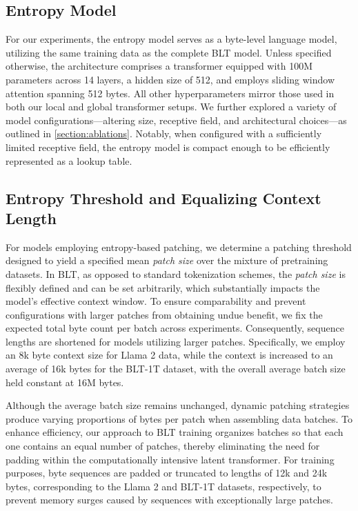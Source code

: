 \subsection{Entropy Model} For our experiments, the entropy model serves as a byte-level language model, utilizing the same training data as the complete {\textsc BLT} model. Unless specified otherwise, the architecture comprises a transformer equipped with 100M parameters across 14 layers, a hidden size of 512, and employs sliding window attention spanning 512 bytes. All other hyperparameters mirror those used in both our local and global transformer setups. We further explored a variety of model configurations—altering size, receptive field, and architectural choices—as outlined in \autoref{section:ablations}. Notably, when configured with a sufficiently limited receptive field, the entropy model is compact enough to be efficiently represented as a lookup table.

\subsection{Entropy Threshold and Equalizing Context Length} For models employing entropy-based patching, we determine a patching threshold designed to yield a specified mean \textit{patch size} over the mixture of pretraining datasets. In {\textsc BLT}, as opposed to standard tokenization schemes, the \textit{patch size} is flexibly defined and can be set arbitrarily, which substantially impacts the model's effective context window. To ensure comparability and prevent configurations with larger patches from obtaining undue benefit, we fix the expected total byte count per batch across experiments. Consequently, sequence lengths are shortened for models utilizing larger patches. Specifically, we employ an 8k byte context size for Llama 2 data, while the context is increased to an average of 16k bytes for the {\textsc BLT}-1T dataset, with the overall average batch size held constant at 16M bytes.

Although the average batch size remains unchanged, dynamic patching strategies produce varying proportions of bytes per patch when assembling data batches. To enhance efficiency, our approach to {\textsc BLT} training organizes batches so that each one contains an equal number of patches, thereby eliminating the need for padding within the computationally intensive latent transformer. For training purposes, byte sequences are padded or truncated to lengths of 12k and 24k bytes, corresponding to the Llama 2 and {\textsc BLT}-1T datasets, respectively, to prevent memory surges caused by sequences with exceptionally large patches.

